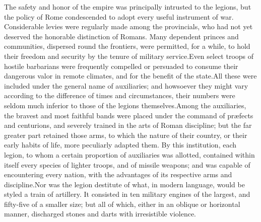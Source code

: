 
The safety and honor of the empire was principally intrusted to
the legions, but the policy of Rome condescended to adopt every
useful instrument of war. Considerable levies were regularly made
among the provincials, who had not yet deserved the honorable
distinction of Romans. Many dependent princes and communities,
dispersed round the frontiers, were permitted, for a while, to
hold their freedom and security by the tenure of military
service.\footnotemark[55] Even select troops of hostile barbarians were
frequently compelled or persuaded to consume their dangerous
valor in remote climates, and for the benefit of the state.\footnotemark[56]
All these were included under the general name of auxiliaries;
and howsoever they might vary according to the difference of
times and circumstances, their numbers were seldom much inferior
to those of the legions themselves.\footnotemark[57] Among the auxiliaries, the
bravest and most faithful bands were placed under the command of
præfects and centurions, and severely trained in the arts of
Roman discipline; but the far greater part retained those arms,
to which the nature of their country, or their early habits of
life, more peculiarly adapted them. By this institution, each
legion, to whom a certain proportion of auxiliaries was allotted,
contained within itself every species of lighter troops, and of
missile weapons; and was capable of encountering every nation,
with the advantages of its respective arms and discipline.\footnotemark[58] Nor
was the legion destitute of what, in modern language, would be
styled a train of artillery. It consisted in ten military engines
of the largest, and fifty-five of a smaller size; but all of
which, either in an oblique or horizontal manner, discharged
stones and darts with irresistible violence.\footnotemark[59]






